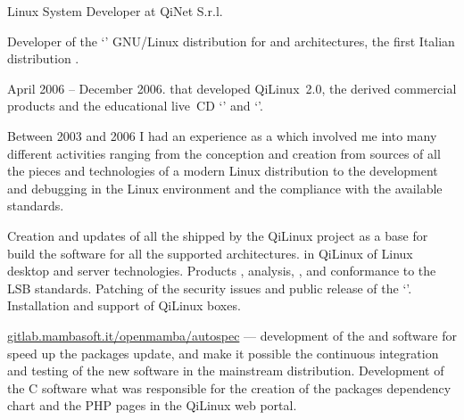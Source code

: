 %


   {Linux System Developer at QiNet S.r.l.}

Developer of the `' GNU/Linux distribution for
 and  architectures, the first Italian
distribution .

April 2006 -- December 2006. 
 that developed QiLinux~2.0, the derived commercial 
products
and the educational live~CD 
`' and `'.

Between 2003 and 2006 I had an experience as a
which involved me into many different activities ranging from the conception
and creation from sources of all the pieces and technologies of a modern Linux
distribution to the development and debugging in the Linux environment and 
the compliance with the available standards.

\smallskip\noindent
\tasks
Creation and updates of all the  shipped by the QiLinux
project as a base for build the software for all the supported architectures.
 in QiLinux of Linux desktop and server technologies.
Products ,  analysis,
, and conformance to the LSB standards.
Patching of the security issues and public release of the 
`'.
Installation and support of QiLinux boxes.

\smallskip\noindent
\software
\url{gitlab.mambasoft.it/openmamba/autospec} ---
development of the  and  software for
speed up the packages update, and make it possible the continuous
integration and testing of the new software in the mainstream distribution.
Development of the C software what was responsible for the creation
of the packages dependency chart and the PHP pages in the QiLinux web portal.

